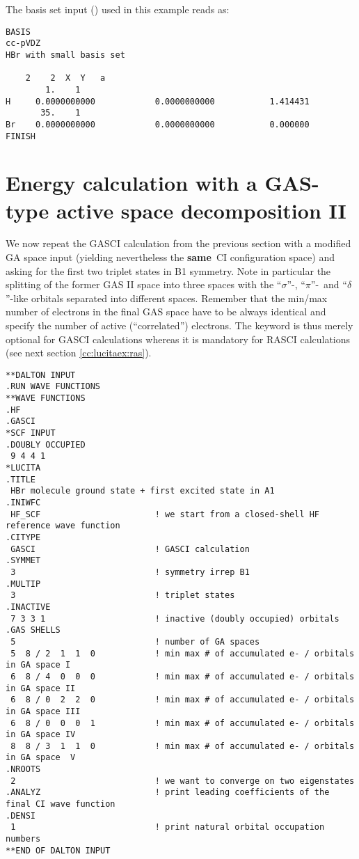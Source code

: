 The basis set input (\molinp) used in this example reads as:

\begin{verbatim}
BASIS
cc-pVDZ
HBr with small basis set

    2    2  X  Y   a
        1.    1
H     0.0000000000            0.0000000000           1.414431
       35.    1
Br    0.0000000000            0.0000000000           0.000000
FINISH
\end{verbatim}

\section{Energy calculation with a GAS-type active space decomposition II}\label{cc:lucitaex:gas2}

We now repeat the GASCI calculation from the previous section 
with a modified GA space input (yielding nevertheless the {\bf{same}}\ CI configuration space) 
and asking for the first two triplet states in B1 symmetry. 
Note in particular the splitting of the former GAS II space into three 
spaces with the ``$\sigma$''-, ``$\pi$''-\ and ``$\delta$''-like orbitals separated into different spaces. 
Remember that the min/max number of electrons in the final GAS space have to be always identical and 
specify the number of active (``correlated'') electrons. The keyword  is thus merely optional for 
GASCI calculations whereas it is mandatory for RASCI calculations (see next section \ref{cc:lucitaex:ras}). 

%
\begin{verbatim}
**DALTON INPUT
.RUN WAVE FUNCTIONS
**WAVE FUNCTIONS
.HF
.GASCI
*SCF INPUT
.DOUBLY OCCUPIED
 9 4 4 1
*LUCITA
.TITLE
 HBr molecule ground state + first excited state in A1
.INIWFC
 HF_SCF                       ! we start from a closed-shell HF reference wave function
.CITYPE
 GASCI                        ! GASCI calculation
.SYMMET
 3                            ! symmetry irrep B1
.MULTIP
 3                            ! triplet states
.INACTIVE
 7 3 3 1                      ! inactive (doubly occupied) orbitals
.GAS SHELLS
 5                            ! number of GA spaces
 5  8 / 2  1  1  0            ! min max # of accumulated e- / orbitals in GA space I
 6  8 / 4  0  0  0            ! min max # of accumulated e- / orbitals in GA space II
 6  8 / 0  2  2  0            ! min max # of accumulated e- / orbitals in GA space III
 6  8 / 0  0  0  1            ! min max # of accumulated e- / orbitals in GA space IV
 8  8 / 3  1  1  0            ! min max # of accumulated e- / orbitals in GA space  V
.NROOTS
 2                            ! we want to converge on two eigenstates
.ANALYZ                       ! print leading coefficients of the final CI wave function
.DENSI
 1                            ! print natural orbital occupation numbers
**END OF DALTON INPUT
\end{verbatim}


